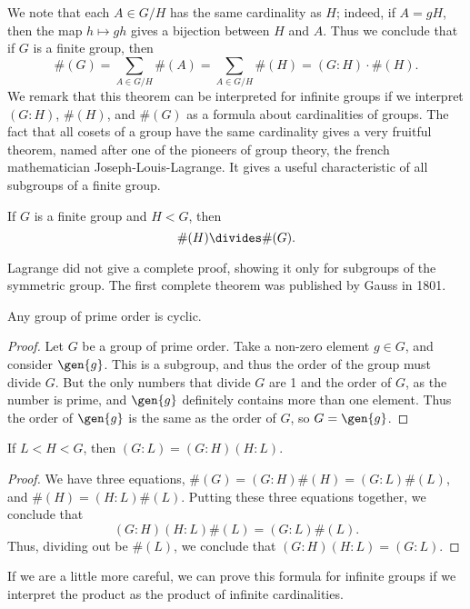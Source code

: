 We note that each $A \in G/H$ has the same cardinality as $H$; indeed, if $A = gH$, then the map $h \mapsto gh$ gives a bijection between $H$ and $A$. Thus we conclude that if $G$ is a finite group, then
%
\[ \#(G) = \sum_{A \in G/H} \#(A) = \sum_{A \in G/H} \#(H) = (G:H) \cdot \#(H). \]
%
We remark that this theorem can be interpreted for infinite groups if we interpret $(G:H)$, $\#(H)$, and $\#(G)$ as a formula about cardinalities of groups. The fact that all cosets of a group have the same cardinality gives a very fruitful theorem, named after one of the pioneers of group theory, the french mathematician Joseph-Louis-Lagrange. It gives a useful characteristic of all subgroups of a finite group.

\begin{theorem}
    If $G$ is a finite group and $H < G$, then
    \[ \#(H) \divides \#(G). \]
\end{theorem}

Lagrange did not give a complete proof, showing it only for subgroups of the symmetric group. The first complete theorem was published by Gauss in 1801.

\begin{corollary} Any group of prime order is cyclic. \end{corollary}
\begin{proof}
    Let $G$ be a group of prime order. Take a non-zero element $g \in G$, and consider $\gen{g}$. This is a subgroup, and thus the order of the group must divide $G$. But the only numbers that divide $G$ are 1 and the order of $G$, as the number is prime, and $\gen{g}$ definitely contains more than one element. Thus the order of $\gen{g}$ is the same as the order of $G$, so $G = \gen{g}$.
\end{proof}

\begin{corollary}If $L < H < G$, then $(G:L) = (G:H)(H:L)$.
\end{corollary}
\begin{proof}
    We have three equations, $\#(G) = (G:H) \#(H) = (G:L) \#(L)$, and $\#(H) = (H:L) \#(L)$. Putting these three equations together, we conclude that
    \[ (G:H)(H:L) \#(L) = (G:L) \#(L). \]
    Thus, dividing out be $\#(L)$, we conclude that $(G:H)(H:L) = (G:L)$.
\end{proof}

\begin{remark}
    If we are a little more careful, we can prove this formula for infinite groups if we interpret the product as the product of infinite cardinalities.
\end{remark}

